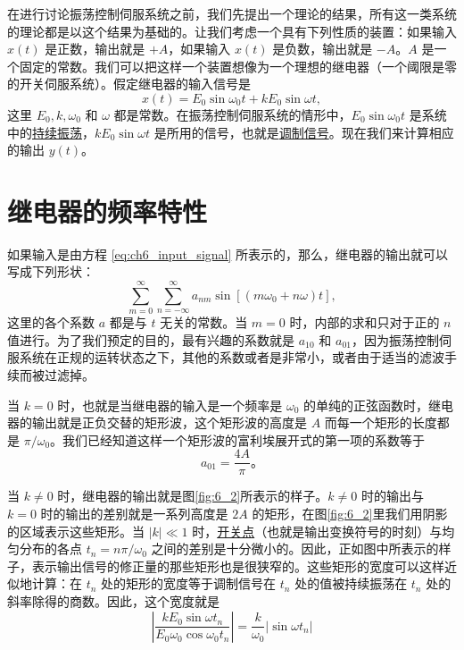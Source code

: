 在进行讨论振荡控制伺服系统之前，我们先提出一个理论的结果，所有这一类系统的理论都是以这个结果为基础的。让我们考虑一个具有下列性质的装置：如果输入 $x(t)$ 是正数，输出就是 $+A$，如果输入 $x(t)$ 是负数，输出就是 $-A$。$A$ 是一个固定的常数。我们可以把这样一个装置想像为一个理想的继电器（一个阈限是零的开关伺服系统）。假定继电器的输入信号是
\begin{equation}\label{eq:ch6_input_signal}
x(t) = E_0 \sin \omega_0 t + kE_0 \sin \omega t,
\end{equation}
这里 $E_0, k, \omega_0$ 和 $\omega$ 都是常数。在振荡控制伺服系统的情形中，$E_0 \sin \omega_0 t$ 是系统中的\underline{持续振荡}，$kE_0 \sin \omega t$ 是所用的信号，也就是\underline{调制信号}。现在我们来计算相应的输出 $y(t)$。

\section{继电器的频率特性}\label{ch6_section_frequency_characteristics_of_relay}


如果输入是由方程 \eqref{eq:ch6_input_signal} 所表示的，那么，继电器的输出就可以写成下列形状：
\begin{equation}\label{eq:ch6_output_of_relay}
\sum_{m=0}^{\infty} \sum_{n=-\infty}^{\infty} a_{nm} \sin[(m\omega_0 + n\omega)t],
\end{equation}
这里的各个系数 $a$ 都是与 $t$ 无关的常数。当 $m=0$ 时，内部的求和只对于正的 $n$ 值进行。为了我们预定的目的，最有兴趣的系数就是 $a_{10}$ 和 $a_{01}$，因为振荡控制伺服系统在正规的运转状态之下，其他的系数或者是非常小，或者由于适当的滤波手续而被过滤掉。

当 $k=0$ 时，也就是当继电器的输入是一个频率是 $\omega_0$ 的单纯的正弦函数时，继电器的输出就是正负交替的矩形波，这个矩形波的高度是 $A$ 而每一个矩形的长度都是 $\pi / \omega_0$。我们已经知道这样一个矩形波的富利埃展开式的第一项的系数等于
\begin{equation}\label{eq:ch6_a01}
a_{01} = \frac{4A}{\pi}。
\end{equation}

当 $k \neq 0$ 时，继电器的输出就是图\ref{fig:6_2}所表示的样子。$k \neq 0$ 时的输出与 $k = 0$ 时的输出的差别就是一系列高度是 $2A$ 的矩形，在图\ref{fig:6_2}里我们用阴影的区域表示这些矩形。当 $|k| \ll 1$ 时，\underline{开关点}（也就是输出变换符号的时刻）与均匀分布的各点 $t_n = n\pi / \omega_0$ 之间的差别是十分微小的。因此，正如图中所表示的样子，表示输出信号的修正量的那些矩形也是很狭窄的。这些矩形的宽度可以这样近似地计算：在 $t_n$ 处的矩形的宽度等于调制信号在 $t_n$ 处的值被持续振荡在 $t_n$ 处的斜率除得的商数。因此，这个宽度就是
\begin{equation*}
\left| \frac{kE_0 \sin \omega t_n}{E_0 \omega_0 \cos \omega_0 t_n} \right| = \frac{k}{\omega_0} |\sin \omega t_n|
\end{equation*}

